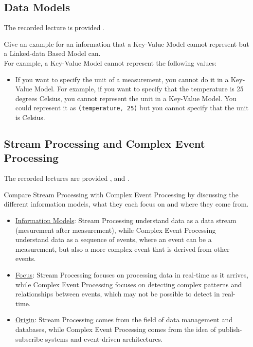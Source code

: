 \newpage\subsection{Data Models}

The recorded lecture is provided .

\begin{ejercicio}
    Give an example for an information that a Key-Value Model cannot represent but a Linked-data Based Model can.\\

    For example, a Key-Value Model cannot represent the following values:
    \begin{itemize}
        \item If you want to specify the unit of a measurement, you cannot do it in a Key-Value Model. For example, if you want to specify that the temperature is 25 degrees Celsius, you cannot represent the unit in a Key-Value Model. You could represent it as \texttt{(temperature, 25)} but you cannot specify that the unit is Celsius.
    \end{itemize}
\end{ejercicio}

\newpage\subsection{Stream Processing and Complex Event Processing}

The recorded lectures are provided ,  and .

\begin{ejercicio}
    Compare Stream Processing with Complex Event Processing by discussing the different information models, what they each focus on and where they come from.

    \begin{itemize}
        \item \ul{Information Models}: Stream Processing understand data as a data stream (mesurement after measurement), while Complex Event Processing understand data as a sequence of events, where an event can be a measurement, but also a more complex event that is derived from other events.
        \item \ul{Focus}: Stream Processing focuses on processing data in real-time as it arrives, while Complex Event Processing focuses on detecting complex patterns and relationships between events, which may not be possible to detect in real-time.
        \item \ul{Origin}: Stream Processing comes from the field of data management and databases, while Complex Event Processing comes from the idea of publish-subscribe systems and event-driven architectures.
    \end{itemize}
\end{ejercicio}

